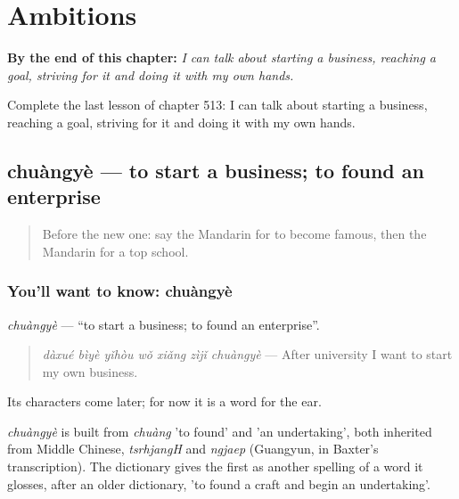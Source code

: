 
\chapter{Ambitions}
\label{ch:zh-ambitions}

\begin{chapteropening}
\textbf{By the end of this chapter:} \emph{I can talk about starting a business, reaching a goal, striving for it and doing it with my own hands.}

Complete the last lesson of chapter 513: I can talk about starting a business, reaching a goal, striving for it and doing it with my own hands.
\end{chapteropening}

\section[chuàngyè]{chuàngyè — to start a business; to found an enterprise}

\label{lesson:ZH-C513-chuangye}



\begin{quote}
Before the new one: say the Mandarin for to become famous, then the Mandarin for a top school.
\end{quote}

\subsection*{You'll want to know: chuàngyè}
\emph{chuàngyè} — \textquotedblleft{}to start a business; to found an enterprise\textquotedblright{}.

\begin{quote}
\emph{dàxué bìyè yǐhòu wǒ xiǎng zìjǐ chuàngyè} — After university I want to start my own business.
\end{quote}

Its characters come later; for now it is a word for the ear.

\begin{cousinweb}
\emph{chuàngyè} is built from \emph{chuàng} 'to found' and  'an undertaking', both inherited from Middle Chinese, \emph{tsrhjangH} and \emph{ngjaep} (Guangyun, in Baxter's transcription). The dictionary gives the first as another spelling of a word it glosses, after an older dictionary, 'to found a craft and begin an undertaking'.
\end{cousinweb}

